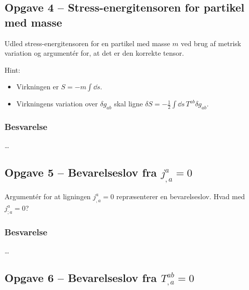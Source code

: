 \documentclass[../main.tex]{subfiles}
\begin{document}

\subsection{Opgave 4 -- Stress-energitensoren for partikel med masse}
\setcounter{subsection}{4}
\setcounter{equation}{0}

Udled stress-energitensoren for en partikel med masse $m$ ved brug af metrisk variation og argumentér for, at det er den korrekte tensor.

Hint:
\begin{itemize}
    \item Virkningen er $S = - m \int \dd s$.
    \item Virkningens variation over $\delta g_{ab}$ skal ligne $\delta S = - \frac{1}{2} \int \dd s\, T^{ab} \delta g_{ab}$.
\end{itemize}


\subsubsection{Besvarelse}

\ldots




\subsection{Opgave 5 -- Bevarelseslov fra $j^a_{,a} = 0$}
\setcounter{subsection}{5}
\setcounter{equation}{0}

Argumentér for at ligningen $j^a_{,a} = 0$ repræsenterer en bevarelseslov. Hvad med $j^a_{;a} = 0$?


\subsubsection{Besvarelse}

\ldots




\subsection{Opgave 6 -- Bevarelseslov fra $T^{ab}_{,a} = 0$}
\setcounter{subsection}{6}
\setcounter{equation}{0}
\end{document}
